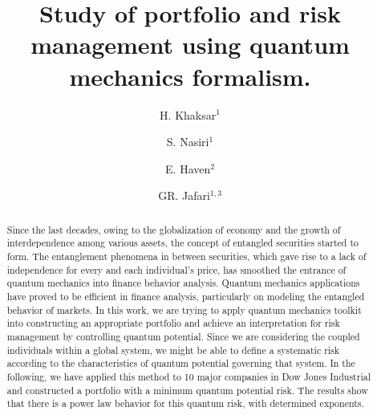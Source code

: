 \documentclass[ aip,jmp,reprint]{revtex4-2}
\begin{document}
\title{Study of portfolio and risk management using quantum mechanics formalism.}
\author{H. Khaksar$^1$}
\author{S. Nasiri$^1$}
\author{E. Haven$^2$}
\author{GR. Jafari$^{1,3}$}

\address{$1)$ Department of Physics, Shahid Beheshti University, G.C., Evin, Tehran 19839, Iran\\ 
	$2)$ Faculty of Business Administration, Memorial University, St. John's, Canada and IQSCS, UK\\ 
	$3)$ Center for Network Science, Central European University,}

\begin{abstract}
Since the last decades, owing to the globalization of economy and the growth of interdependence among various assets, the concept of entangled securities started to form. The entanglement phenomena in between securities, which gave rise to a lack of independence for every and each individual's price, has smoothed the entrance of quantum mechanics into finance behavior analysis. Quantum mechanics applications have proved to be efficient in finance analysis, particularly on modeling the entangled behavior of markets. In this work, we are trying to apply quantum mechanics toolkit into constructing an appropriate portfolio and achieve an interpretation for risk management by controlling quantum potential. Since we are considering the coupled individuals within a global system, we might be able to define a systematic risk according to the characteristics of quantum potential governing that system. In the following, we have applied this method to 10 major companies in Dow Jones Industrial and constructed a portfolio with a minimum quantum potential risk. The results show that there is a power law behavior for this quantum risk, with determined exponents.
\end{abstract}

\maketitle
\end{document}
